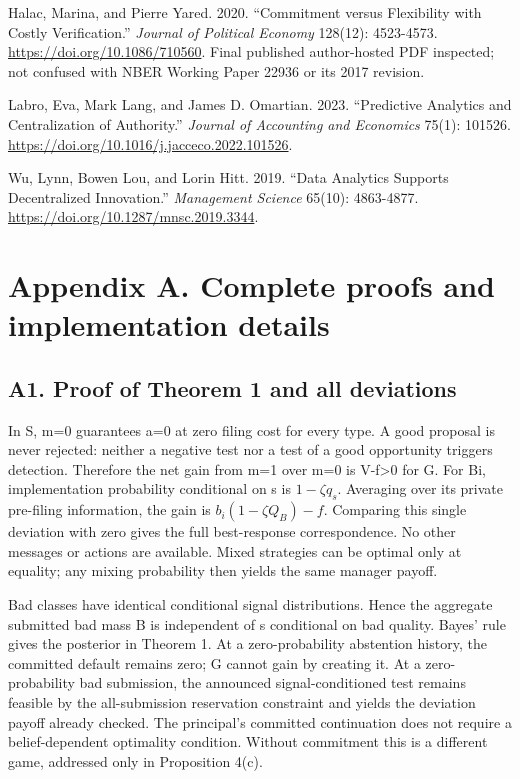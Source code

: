 \documentclass[
  11pt,
]{article}
\begin{document}
{Halac, Marina, and Pierre Yared. 2020. ``Commitment versus Flexibility
with Costly Verification.'' \emph{Journal of Political Economy} 128(12):
4523-4573. \url{https://doi.org/10.1086/710560}. Final published author-hosted
PDF inspected; not confused with NBER Working Paper 22936 or its 2017
revision.

Labro, Eva, Mark Lang, and James D. Omartian. 2023. ``Predictive
Analytics and Centralization of Authority.'' \emph{Journal of Accounting
and Economics} 75(1): 101526.
\url{https://doi.org/10.1016/j.jacceco.2022.101526}.

Wu, Lynn, Bowen Lou, and Lorin Hitt. 2019. ``Data Analytics Supports
Decentralized Innovation.'' \emph{Management Science} 65(10): 4863-4877.
\url{https://doi.org/10.1287/mnsc.2019.3344}.

}
\clearpage
\section{Appendix A. Complete proofs and implementation
details}\label{appendix-a.-complete-proofs-and-implementation-details}

\subsection{A1. Proof of Theorem 1 and all
deviations}\label{a1.-proof-of-theorem-1-and-all-deviations}

In S, m=0 guarantees a=0 at zero filing cost for every type. A good
proposal is never rejected: neither a negative test nor a test of a good
opportunity triggers detection. Therefore the net gain from m=1 over m=0
is V-f\textgreater0 for G. For Bi, implementation probability
conditional on s is \(1-\zeta q_s\). Averaging over its private
pre-filing information, the gain is \(b_i(1-\zeta Q_B)-f\). Comparing
this single deviation with zero gives the full best-response
correspondence. No other messages or actions are available. Mixed
strategies can be optimal only at equality; any mixing probability then
yields the same manager payoff.

Bad classes have identical conditional signal distributions. Hence the
aggregate submitted bad mass B is independent of s conditional on bad
quality. Bayes' rule gives the posterior in Theorem 1. At a
zero-probability abstention history, the committed default remains zero;
G cannot gain by creating it. At a zero-probability bad submission, the
announced signal-conditioned test remains feasible by the all-submission
reservation constraint and yields the deviation payoff already checked.
The principal's committed continuation does not require a
belief-dependent optimality condition. Without commitment this is a
different game, addressed only in Proposition 4(c).
\end{document}
